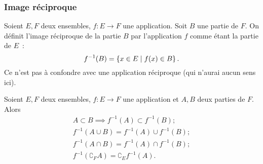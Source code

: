 \subsubsection{Image réciproque} 
\label{chap3-subsubsec:imagereciproque}
\begin{defdef}
  Soient \(E,F\) deux ensembles, \(f:E \longrightarrow F\) une application. Soit \(B\) une partie de \(F\). On définit l'image réciproque de la partie \(B\) par l'application \(f\) comme étant la partie de \(E\)~:
  \begin{equation}
    f^{-1}(B)=\left\{x \in E\mathrel{}\middle|\mathrel{}f(x) \in B\right\}.
  \end{equation}
  Ce n'est pas à confondre avec une application réciproque (qui n'aurai aucun sens ici).
\end{defdef}
%
\begin{prop}
  Soient \(E,F\) deux ensembles, \(f:E \longrightarrow F\) une application et \(A,B\) deux parties de \(F\). Alors
  \begin{gather}
    A \subset B \implies f^{-1}(A) \subset f^{-1}(B);\\
    f^{-1}(A \cup B) = f^{-1}(A) \cup f^{-1}(B);\\
    f^{-1}(A \cap B) = f^{-1}(A) \cap f^{-1}(B);\\
    f^{-1}(\complement_F A) = \complement_E f^{-1}(A).
  \end{gather}
\end{prop}

